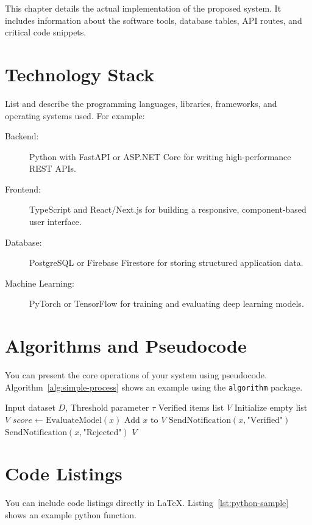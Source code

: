 This chapter details the actual implementation of the proposed system. It includes information about the software tools, database tables, API routes, and critical code snippets.

\section{Technology Stack}
List and describe the programming languages, libraries, frameworks, and operating systems used. For example:
\begin{description}
    \item[Backend:] Python with FastAPI or ASP.NET Core for writing high-performance REST APIs.
    \item[Frontend:] TypeScript and React/Next.js for building a responsive, component-based user interface.
    \item[Database:] PostgreSQL or Firebase Firestore for storing structured application data.
    \item[Machine Learning:] PyTorch or TensorFlow for training and evaluating deep learning models.
\end{description}

\section{Algorithms and Pseudocode}
You can present the core operations of your system using pseudocode. Algorithm~\ref{alg:simple-process} shows an example using the \texttt{algorithm} package.

\begin{algorithm}[H]
\caption{Data Processing and Verification}
\label{alg:simple-process}
\begin{algorithmic}[1]
\REQUIRE Input dataset $D$, Threshold parameter $\tau$
\ENSURE Verified items list $V$
\STATE Initialize empty list $V$
    \STATE $score \leftarrow \text{EvaluateModel}(x)$
        \STATE Add $x$ to $V$
        \STATE $\text{SendNotification}(x, \text{"Verified"})$
    \ELSE
        \STATE $\text{SendNotification}(x, \text{"Rejected"})$
    \ENDIF
\ENDFOR
\RETURN $V$
\end{algorithmic}
\end{algorithm}

\section{Code Listings}
You can include code listings directly in LaTeX. Listing~\ref{lst:python-sample} shows an example python function.

